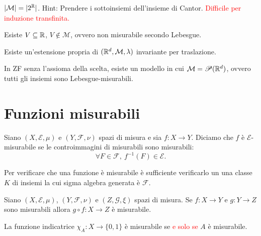\begin{exercise}
	$\left|\mathcal{M}\right|=|2^{\mathbb{R}}|$.
	Hint: Prendere i sottoinsiemi dell'insieme di Cantor. \textcolor{red}{Difficile per induzione transfinita.}
\end{exercise}

\begin{exercise}
	Esiste $V\subseteq \mathbb{R}$, $V\not\in \mathcal{M}$, ovvero non misurabile secondo Lebesgue.
\end{exercise}

\begin{exercise}
	Esiste un'estensione propria di $(\mathbb{R}^d, \mathcal{M}, \lambda)$ invariante per traslazione.
\end{exercise}

\begin{exercise}
	In ZF senza l'assioma della scelta, esiste un modello in cui $\mathcal{M}=\mathscr{P}(\mathbb{R}^d)$, ovvero tutti gli insiemi sono Lebesgue-misurabili.
\end{exercise}

\section{Funzioni misurabili}
\begin{definition}
	Siano $ (X,\mathcal{E},\mu) $ e $ (Y,\mathcal{F},\nu) $ spazi di misura e sia \linebreak$ f\colon X\to Y $. Diciamo che $ f $ è $ \mathcal{E} $-misurabile se le controimmagini di misurabili sono misurabili:
	\[ 
        \forall F \in \mathcal{F}, \ f^{-1}(F) \in \mathcal{E}.
    \]
\end{definition}

\begin{oss}
    Per verificare che una funzione è misurabile è sufficiente verificarlo un una classe $ K $ di insiemi la cui sigma algebra generata è $ \mathcal{F} $.
\end{oss}

\begin{proposition}
    Siano $ (X,\mathcal{E},\mu) $, $ (Y,\mathcal{F},\nu) $ e $ (Z, \mathcal{G}, \xi) $ spazi di misura. Se $ f \colon X \to Y $ e $ g \colon Y \to Z $ sono misurabili allora $ g \circ f \colon X \to Z $ è misurabile.
\end{proposition}

\begin{exercise}
	La funzione indicatrice $ \chi_A \colon X \to \{0,1\} $ è misurabile se \textcolor{red}{e solo se} $ A $ è misurabile.
\end{exercise}

